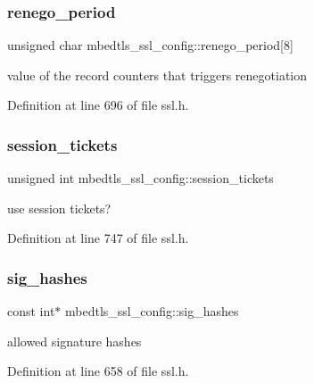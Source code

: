 \subsubsection{\texorpdfstring{renego\+\_\+period}{renego\_period}}
{\footnotesize\ttfamily unsigned char mbedtls\+\_\+ssl\+\_\+config\+::renego\+\_\+period\mbox{[}8\mbox{]}}

value of the record counters that triggers renegotiation 

Definition at line 696 of file ssl.\+h.

\mbox{\label{structmbedtls__ssl__config_a1b988bcd1b38c51cb802bf8af5d05c7b}} 
\subsubsection{\texorpdfstring{session\+\_\+tickets}{session\_tickets}}
{\footnotesize\ttfamily unsigned int mbedtls\+\_\+ssl\+\_\+config\+::session\+\_\+tickets}

use session tickets? 

Definition at line 747 of file ssl.\+h.

\mbox{\label{structmbedtls__ssl__config_a82552e1dd3c9065ef98e2835fc925653}} 
\subsubsection{\texorpdfstring{sig\+\_\+hashes}{sig\_hashes}}
{\footnotesize\ttfamily const int$\ast$ mbedtls\+\_\+ssl\+\_\+config\+::sig\+\_\+hashes}

allowed signature hashes 

Definition at line 658 of file ssl.\+h.

\mbox{\label{structmbedtls__ssl__config_a63cafd8d131ac7d162406b47bc6565d0}} 
